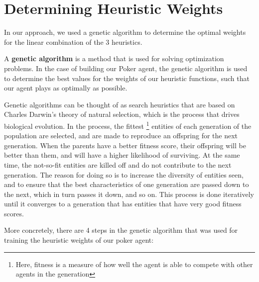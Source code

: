 \documentclass{article}
\begin{document}
\section{Determining Heuristic Weights}

In our approach, we used a genetic algorithm to determine the optimal weights for the linear combination of the 3 heuristics. 

A {\bf genetic algorithm} is a method that is used for solving optimization problems. In the case of building our Poker agent, the genetic algorithm is used to determine the best values for the weights of our heuristic functions, such that our agent plays as optimally as possible.

Genetic algorithms can be thought of as search heuristics that are based on Charles Darwin’s theory of natural selection, which is the process that drives biological evolution. In the process, the fittest \footnote{Here, fitness is a measure of how well the agent is able to compete with other agents in the generation}  entities of each generation of the population are selected, and are made to reproduce an offspring for the next generation. When the parents have a better fitness score, their offspring will be better than them, and will have a higher likelihood of surviving. At the same time, the not-so-fit entities are killed off and do not contribute to the next generation. The reason for doing so is to increase the diversity of entities seen,  and to ensure that the best characteristics of one generation are passed down to the next, which in turn passes it down, and so on. This process is done iteratively until it converges to a generation that has entities that have very good fitness scores. 

More concretely, there are 4 steps in the genetic algorithm that was used for training the heuristic weights of our poker agent:
\end{document}
